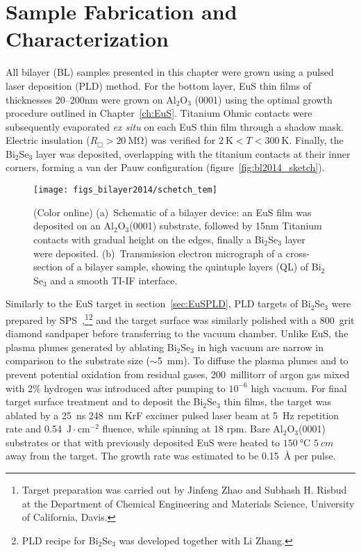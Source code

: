 \section{Sample Fabrication and Characterization}\label{sec:bilayer2014_char}
All bilayer (BL) samples presented in this chapter were grown using a pulsed laser deposition (PLD) method. For the bottom layer, EuS thin films of thicknesses 20--200nm were grown on Al$_2$O$_3$ (0001) using the optimal growth procedure outlined in Chapter~\ref{ch:EuS}. Titanium Ohmic contacts were subsequently evaporated {\it ex situ} on each EuS thin film through a shadow mask. Electric insulation ($R_\Box > 20~\mathrm{M\Omega}$) was verified for $2~\mathrm{K}<T<300~\mathrm{K}$. Finally, the Bi$_2$Se$_3$ layer was deposited, overlapping with the titanium contacts at their inner corners, forming a van der Pauw configuration (figure~\ref{fig:bl2014_sketch}).%
%
\begin{figure}[h]%
\centering%
\subfloat{\label{fig:bl2014_sketch}}%
\subfloat{\label{fig:bl2014_TEM}}%
\texttt{[image: figs\_bilayer2014/schetch\_tem]}%
\caption[Schematic and cross-section TEM of Bi$_2$Se$_3$--EuS thin film bilayers]{(Color online) (a)~Schematic of a bilayer device: an EuS film was deposited on an Al$_2$O$_3$(0001) substrate, followed by 15nm Titanium contacts with gradual height on the edges, finally a Bi$_2$Se$_3$ layer were deposited. (b)~Transmission electron micrograph of a cross-section of a bilayer sample, showing the quintuple layers (QL) of Bi$_2$Se$_3$ and a smooth TI-IF interface.}%
\end{figure}%

Similarly to the EuS target in section~\ref{sec:EuSPLD}, PLD targets of Bi$_2$Se$_3$ were prepared by SPS~\cite{Jinfeng2, Subhash1},\footnote{Target preparation was carried out by Jinfeng Zhao and Subhash H. Risbud at the Department of Chemical Engineering and Materials Science, University of California, Davis.}\footnote{PLD recipe for Bi$_2$Se$_3$ was developed together with Li Zhang.} and the target surface was similarly polished with a 800~grit diamond sandpaper before transferring to the vacuum chamber. Unlike EuS, the plasma plumes generated by ablating Bi$_2$Se$_3$ in high vacuum are narrow in comparison to the substrate size ($\sim$5~mm). To diffuse the plasma plumes and to prevent potential oxidation from residual gases, 200~millitorr of argon gas mixed with 2\% hydrogen was introduced after pumping to $10^{-6}$ high vacuum. For final target surface treatment and to deposit the Bi$_2$Se$_3$ thin films, the target was ablated by a 25~ns 248~nm KrF excimer pulsed laser beam at 5~Hz repetition rate and 0.54~$\mathrm{J\cdot{}cm^{-2}}$ fluence, while spinning at 18 rpm. Bare Al$_2$O$_3$(0001) substrates or that with previously deposited EuS were heated to $\SI{150}{\degreeCelsius}$ $\SI{5}{cm}$ away from the target. The growth rate was estimated to be 0.15~\AA{} per pulse.

